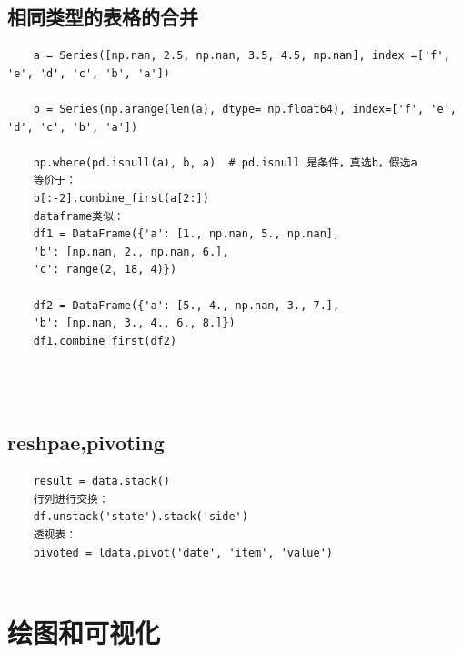 \documentclass{article}
\begin{document}
\subsection{相同类型的表格的合并}


\begin{lstlisting}
	a = Series([np.nan, 2.5, np.nan, 3.5, 4.5, np.nan], index =['f', 'e', 'd', 'c', 'b', 'a'])
	
	b = Series(np.arange(len(a), dtype= np.float64), index=['f', 'e', 'd', 'c', 'b', 'a'])
	
	np.where(pd.isnull(a), b, a)  # pd.isnull 是条件，真选b，假选a
	等价于：
	b[:-2].combine_first(a[2:])
	dataframe类似：
	df1 = DataFrame({'a': [1., np.nan, 5., np.nan],
	'b': [np.nan, 2., np.nan, 6.],
	'c': range(2, 18, 4)})
	
	df2 = DataFrame({'a': [5., 4., np.nan, 3., 7.],
	'b': [np.nan, 3., 4., 6., 8.]})
	df1.combine_first(df2)
	
	
	
\end{lstlisting}

\subsection{reshpae,pivoting}
\begin{lstlisting}
	result = data.stack()
	行列进行交换：
	df.unstack('state').stack('side')
	透视表：
	pivoted = ldata.pivot('date', 'item', 'value')
	
\end{lstlisting}

\section{绘图和可视化}
\end{document}
